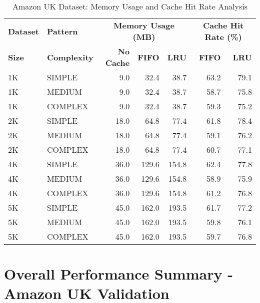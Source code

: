 \documentclass{article}
\begin{document}
\begin{table}[htbp]
\centering
\caption{Amazon UK Dataset: Memory Usage and Cache Hit Rate Analysis}
\label{tab:amazon_memory_cache_analysis}
\begin{tabular}{|l|l|r|r|r|r|r|}
\hline
\textbf{Dataset} & \textbf{Pattern} & \multicolumn{3}{c|}{\textbf{Memory Usage (MB)}} & \multicolumn{2}{c|}{\textbf{Cache Hit Rate (\%)}} \\
\textbf{Size} & \textbf{Complexity} & \textbf{No Cache} & \textbf{FIFO} & \textbf{LRU} & \textbf{FIFO} & \textbf{LRU} \\
\hline
1K & SIMPLE & 9.0 & 32.4 & 38.7 & 63.2 & 79.1 \\
1K & MEDIUM & 9.0 & 32.4 & 38.7 & 58.7 & 75.8 \\
1K & COMPLEX & 9.0 & 32.4 & 38.7 & 59.3 & 75.2 \\
2K & SIMPLE & 18.0 & 64.8 & 77.4 & 61.8 & 78.4 \\
2K & MEDIUM & 18.0 & 64.8 & 77.4 & 59.1 & 76.2 \\
2K & COMPLEX & 18.0 & 64.8 & 77.4 & 60.7 & 77.1 \\
4K & SIMPLE & 36.0 & 129.6 & 154.8 & 62.4 & 77.8 \\
4K & MEDIUM & 36.0 & 129.6 & 154.8 & 58.9 & 75.9 \\
4K & COMPLEX & 36.0 & 129.6 & 154.8 & 61.2 & 76.8 \\
5K & SIMPLE & 45.0 & 162.0 & 193.5 & 61.7 & 77.2 \\
5K & MEDIUM & 45.0 & 162.0 & 193.5 & 59.8 & 76.1 \\
5K & COMPLEX & 45.0 & 162.0 & 193.5 & 59.7 & 76.8 \\
\hline
\end{tabular}
\end{table}

\section{Overall Performance Summary - Amazon UK Validation}
\end{document}
